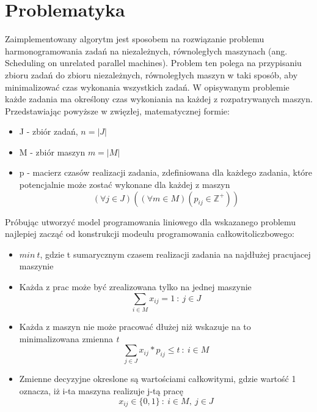 \documentclass[12pt, a4paper]{report}
\begin{document}
\chapter{Problematyka}
  Zaimplementowany algorytm jest sposobem na rozwiązanie problemu harmonogramowania zadań na niezależnych, równoległych
  maszynach (ang. Scheduling on unrelated parallel machines). Problem ten polega na przypisaniu 
  zbioru zadań do zbioru niezależnych, równoległych maszyn w taki sposób, aby minimalizować czas wykonania wszystkich zadań.
  W opisywanym problemie każde zadania ma określony czas wykoniania na każdej z rozpatrywanych maszyn.
  Przedstawiając powyższe w zwięzłej, matematycznej formie:
  \begin{itemize}
    \item J - zbiór zadań, $n = |J|$
    \item M - zbiór maszyn $m = |M|$
    \item p - macierz czasów realizacji zadania, zdefiniowana dla każdego zadania, które potencjalnie może zostać 
    wykonane dla każdej z maszyn 
    \begin{equation}
      (\forall j \in J) ((\forall m \in M) (p_{ij} \in \mathbb{Z}^{+} ))
    \end{equation}

  \end{itemize}
  Próbując utworzyć model programowania liniowego dla wskazanego problemu najlepiej zacząć 
  od konstrukcji modeulu programowania całkowitoliczbowego:
  \begin{itemize}
    \item $min \: t$, gdzie t sumarycznym czasem realizacji zadania na najdłużej pracujacej maszynie
    \item Każda z prac może być zrealizowana tylko na jednej maszynie
    \begin{equation}
      \sum_{i \in M} x_{ij} = 1 \: : \: j \in J
    \end{equation} 
    \item Każda z maszyn nie może pracować dłużej niż wskazuje na to minimalizowana zmienna \textit{t}
    \begin{equation}
      \sum_{j \in J} x_{ij} * p_{ij} \leq t \: : \: i \in M
    \end{equation}
    \item Zmienne decyzyjne okreslone są wartościami całkowitymi, gdzie wartość 1 oznacza, 
    iż i-ta maszyna realizuje j-tą pracę
    \begin{equation}
      x_{ij} \in \{0,1\} \: : \: i \in M, \: j \in J
    \end{equation}
  \end{itemize}
\end{document}
